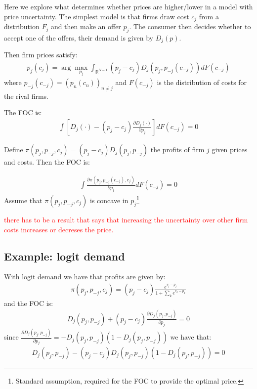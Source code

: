 \documentclass[12pt]{article}
\begin{document}
Here we explore what determines whether prices are higher/lower in a model with price uncertainty. The simplest model is that firms draw cost $c_j$ from a distribution $F_j$ and then make an offer $p_j$. The consumer then decides whether to accept one of the offers, their demand is given by $D_j(p)$. 

Then firm prices satisfy: 
\begin{align} \label{eq:base_equilibrium} %
    p_j(c_j) = \arg \max_{p_j} \int_{\mathbb{R}^{N-1}}^{} (p_j - c_j) D_j(p_j, p_{-j}(c_{-j})) dF(c_{-j})
\end{align} 
where $p_{-j}(c_{-j}) = (p_n(c_n))_{n \neq j}$ and $F(c_{-j} )$ is the distribution of costs for the rival firms. 


The FOC is: 
\begin{align} %
    \int \left[ D_j(\cdot) - (p_j - c_j) \frac{\partial D_j(\cdot)}{\partial p_j } \right] dF(c_{-j}) = 0  
\end{align}


Define $ \pi(p_j, p_{-j}, c_j) = (p_j - c_j) D_j(p_j, p_{-j})$ the profits of firm $j$ given prices and costs. Then the FOC is: 

\begin{align} %
    \int \frac{\partial \pi(p_j, p_{-j}(c_{-j}), c_j) }{\partial p_j} dF(c_{-j}) = 0  
\end{align}
Assume that $\pi(p_j, p_{-j}, c_j)$ is concave in $p_j$\footnote{Standard assumption, required for the FOC to provide the optimal price.}

\textcolor{red}{there has to be a result that says that increasing the uncertainty over other firm costs increases or decreses the price.}




\vspace{3cm}


\subsection{Example: logit demand}
With logit demand we have that profits are given by: 
\begin{align}
    \pi(p_j, p_{-j}, c_j) = (p_j - c_j) \frac{e^{v_j - p_j}}{1 + \sum_{k} e^{v_k - p_k}}
\end{align}
and the FOC is: 
\begin{align}
    D_j(p_j, p_{-j}) + (p_j - c_j) \frac{\partial D_j(p_j, p_{-j})}{\partial p_j} = 0
\end{align}
since $\frac{\partial D_j(p_j, p_{-j})}{\partial p_j} = - D_j(p_j, p_{-j}) (1 - D_j(p_j, p_{-j}))$ we have that:
\begin{align}\label{eq:2.3}
    D_j(p_j, p_{-j}) - (p_j - c_j) D_j(p_j, p_{-j}) (1 - D_j(p_j, p_{-j})) = 0
\end{align}
\end{document}

